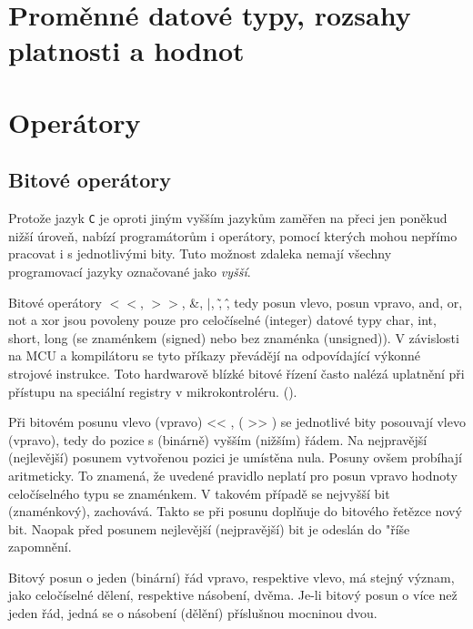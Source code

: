 
  \section{Proměnné datové typy, rozsahy platnosti a hodnot}\label{ces:C_chapIsecIII}
  \section{Operátory}\label{ces:C_chapIsecIV}
    \subsection{Bitové  operátory}
      Protože jazyk \texttt{C} je oproti jiným vyšším jazykům zaměřen na přeci jen poněkud nižší 
      úroveň, 
      nabízí programátorům i operátory, pomocí kterých mohou nepřímo pracovat i s jednotlivými bity.
      Tuto možnost zdaleka nemají všechny programovací jazyky označované jako \emph{vyšší}.
      
      Bitové operátory \(<<\), \(>>\), \&, \(\lvert\), \~, \^, tedy posun vlevo, posun vpravo, and,
      or, not a xor jsou povoleny pouze pro celočíselné (integer) datové typy char, int, short, long
      (se znaménkem (signed) nebo bez znaménka (unsigned)). V závislosti na MCU a kompilátoru se
      tyto příkazy převádějí na odpovídající výkonné strojové instrukce. Toto hardwarově blízké
      bitové řízení často nalézá uplatnění při přístupu na speciální registry v mikrokontroléru.
      (\cite[s.~79]{Burkhard2003}).
      
      Při bitovém posunu vlevo (vpravo) << , ( >> ) se jednotlivé bity posouvají vlevo (vpravo), 
      tedy do pozice s (binárně) vyšším (nižším) řádem. Na nejpravější (nejlevější) posunem 
      vytvořenou pozici je umístěna nula. Posuny ovšem probíhají aritmeticky. To znamená, že 
      uvedené pravidlo neplatí pro posun vpravo hodnoty celočíselného typu se znaménkem. V takovém 
      případě se nejvyšší bit (znaménkový), zachovává. Takto se při posunu doplňuje do bitového 
      řetězce nový bit. Naopak před posunem nejlevější (nejpravější) bit je odeslán do
      "říše zapomnění.
      
      Bitový posun o jeden (binární) řád vpravo, respektive vlevo, má stejný význam, jako 
      celočíselné dělení, respektive násobení, dvěma. Je-li bitový posun o více než jeden řád, 
      jedná se o násobení (dělění) příslušnou mocninou dvou.
      
